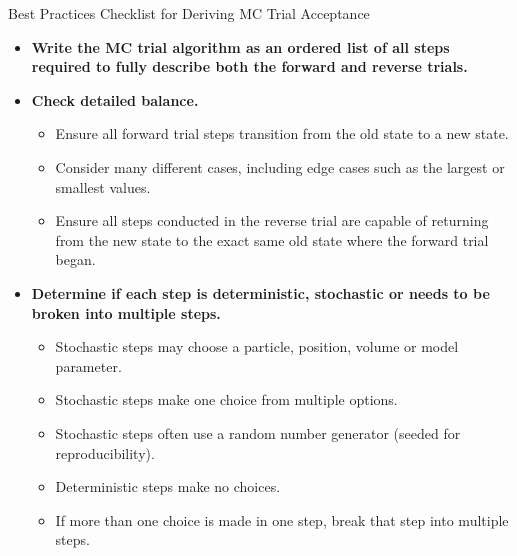 \begin{Checklists*}[p!]
\begin{checklist}{Best Practices Checklist for Deriving MC Trial Acceptance}
\begin{itemize}
\item
  \textbf{Write the MC trial algorithm as an ordered list of all steps required to fully describe both the forward and reverse trials.}

\item
  \textbf{Check detailed balance.}
  \begin{itemize}
    \item Ensure all forward trial steps transition from the old state to a new state.
    \item Consider many different cases, including edge cases such as the largest or smallest values.
    \item Ensure all steps conducted in the reverse trial are capable of returning from the new state to the exact same old state where the forward trial began.
  \end{itemize}

\item
  \textbf{Determine if each step is deterministic, stochastic or needs to be broken into multiple steps.}
  \begin{itemize}
    \item Stochastic steps may choose a particle, position, volume or model parameter.
    \item Stochastic steps make one choice from multiple options.
    \item Stochastic steps often use a random number generator (seeded for reproducibility).
    \item Deterministic steps make no choices.
    \item If more than one choice is made in one step, break that step into multiple steps.
  \end{itemize}


\end{itemize}
\end{checklist}
\end{Checklists*}
